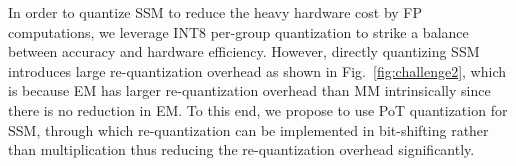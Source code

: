 In order to quantize SSM to reduce the heavy hardware cost by FP computations,
we leverage INT8 per-group quantization
to strike a balance between accuracy and hardware efficiency.
However, directly quantizing SSM introduces
large re-quantization overhead as shown in Fig.~\ref{fig:challenge2},
which is
because EM has larger re-quantization overhead than MM intrinsically since there is no reduction in EM.
To this end,
we propose to use PoT quantization for SSM,
through which re-quantization can be implemented in bit-shifting
rather than multiplication
thus reducing the re-quantization overhead significantly.















